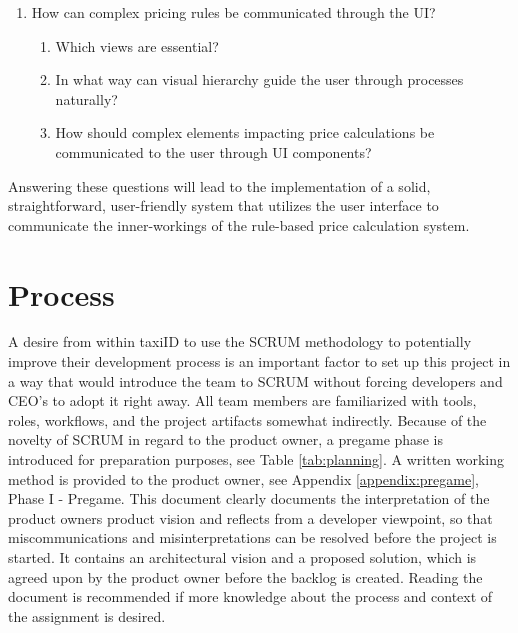 \begin{enumerate}
	\item How can complex pricing rules be communicated through the UI?
	      \begin{enumerate}[label*=\arabic*.]
		      \item Which views are essential?
		      \item In what way can visual hierarchy guide the user through processes naturally?
		      \item How should complex elements impacting price calculations be communicated to the user through UI components?
	      \end{enumerate}

\end{enumerate}

Answering these questions will lead to the implementation of a solid, straightforward, user-friendly system that utilizes the user interface to communicate the inner-workings of the rule-based price calculation system.

%
\section{Process}
A desire from within taxiID to use the SCRUM methodology to potentially improve their development process is an important factor to set up this project in a way that would introduce the team to SCRUM without forcing developers and CEO's to adopt it right away. All team members are familiarized with tools, roles, workflows, and the project artifacts somewhat indirectly. Because of the novelty of SCRUM in regard to the product owner, a pregame phase is introduced for preparation purposes, see Table \ref{tab:planning}. A written working method is provided to the product owner, see Appendix \ref{appendix:pregame}, Phase I - Pregame. This document clearly documents the interpretation of the product owners product vision and reflects from a developer viewpoint, so that miscommunications and misinterpretations can be resolved before the project is started. It contains an architectural vision and a proposed solution, which is agreed upon by the product owner before the backlog is created. Reading the document is recommended if more knowledge about the process and context of the assignment is desired.


